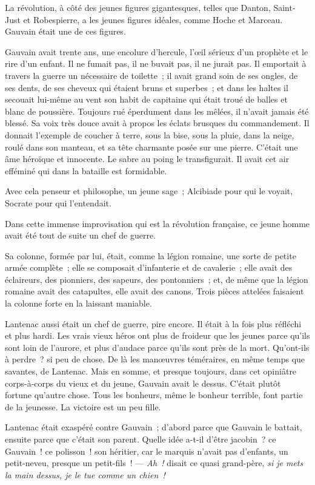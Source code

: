 \documentclass[french,twoside]{book} %
\begin{document}
La révolution, à côté des jeunes figures gigantesques, telles que Danton, Saint-Just et Robespierre, a les jeunes figures idéales, comme Hoche et Marceau. Gauvain était une de ces figures.\par
Gauvain avait trente ans, une encolure d’hercule,  l’œil sérieux d’un prophète et le rire d’un enfant. Il ne fumait pas, il ne buvait pas, il ne jurait pas. Il emportait à travers la guerre un nécessaire de toilette ; il avait grand soin de ses ongles, de ses dents, de ses cheveux qui étaient bruns et superbes ; et dans les haltes il secouait lui-même au vent son habit de capitaine qui était troué de balles et blanc de poussière. Toujours rué éperdument dans les mêlées, il n’avait jamais été blessé. Sa voix très douce avait à propos les éclats brusques du commandement. Il donnait l’exemple de coucher à terre, sous la bise, sous la pluie, dans la neige, roulé dans son manteau, et sa tête charmante posée sur une pierre. C’était une âme héroïque et innocente. Le sabre au poing le transfigurait. Il avait cet air efféminé qui dans la bataille est formidable.\par
Avec cela penseur et philosophe, un jeune sage ; Alcibiade pour qui le voyait, Socrate pour qui l’entendait.\par
Dans cette immense improvisation qui est la révolution française, ce jeune homme avait été tout de suite un chef de guerre.\par
Sa colonne, formée par lui, était, comme la légion romaine, une sorte de petite armée complète ; elle se composait d’infanterie et de cavalerie ; elle avait des éclaireurs, des pionniers, des sapeurs, des pontonniers ; et, de même que la légion romaine avait des catapultes, elle avait des canons. Trois pièces attelées faisaient la colonne forte en la laissant maniable.\par
 Lantenac aussi était un chef de guerre, pire encore. Il était à la fois plus réfléchi et plus hardi. Les vrais vieux héros ont plus de froideur que les jeunes parce qu’ils sont loin de l’aurore, et plus d’audace parce qu’ils sont près de la mort. Qu’ont-ils à perdre ? si peu de chose. De là les manœuvres téméraires, en même temps que savantes, de Lantenac. Mais en somme, et presque toujours, dans cet opiniâtre corps-à-corps du vieux et du jeune, Gauvain avait le dessus. C’était plutôt fortune qu’autre chose. Tous les bonheurs, même le bonheur terrible, font partie de la jeunesse. La victoire est un peu fille.\par
Lantenac était exaspéré contre Gauvain ; d’abord parce que Gauvain le battait, ensuite parce que c’était son parent. Quelle idée a-t-il d’être jacobin ? ce Gauvain ! ce polisson ! son héritier, car le marquis n’avait pas d’enfants, un petit-neveu, presque un petit-fils ! — \emph{Ah !} disait ce quasi grand-père, \emph{si je mets la main dessus, je le tue comme un chien !}\par
\end{document}
